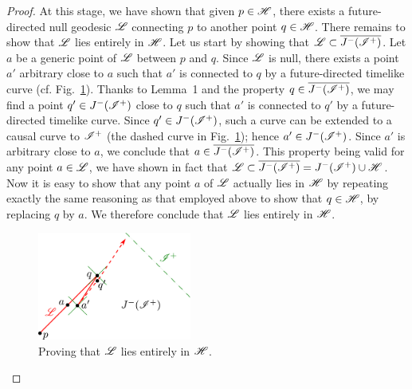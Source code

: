 \begin{proof}
At this stage, we have shown that given $p\in\mathscr{H}$, there exists
a future-directed null geodesic $\mathscr{L}$ connecting $p$ to another point $q\in\mathscr{H}$.
There remains to show that $\mathscr{L}$ lies entirely in $\mathscr{H}$.
Let us start by showing that $\mathscr{L}\subset \overline{J^-(\mathscr{I}^+)}$.
Let $a$ be a generic point of $\mathscr{L}$ between $p$ and $q$. Since $\mathscr{L}$ is
null, there exists a point
$a'$ arbitrary close to $a$ such that $a'$ is connected to $q$ by a
future-directed timelike curve (cf. Fig.~\ref{f:glo:L_in_H}). Thanks to Lemma~1
and the property $q\in \overline{J^-(\mathscr{I}^+)}$, we may
find a point $q'\in J^-(\mathscr{I}^+)$ close to $q$ such that $a'$ is connected
to $q'$ by a future-directed timelike curve.
Since $q'\in J^-(\mathscr{I}^+)$, such a curve can be extended
to a causal curve to $\mathscr{I}^+$  (the dashed curve
in Fig.~\ref{f:glo:L_in_H}); hence
$a'\in  J^-(\mathscr{I}^+)$. Since $a'$ is arbitrary close to $a$, we conclude
that $a\in\overline{J^-(\mathscr{I}^+)}$.
This property being valid for any point $a\in \mathscr{L}$, we have
shown in fact that $\mathscr{L}\subset \overline{J^-(\mathscr{I}^+)} = J^-(\mathscr{I}^+)\cup \mathscr{H}$.
Now it is easy to show that any point $a$ of $\mathscr{L}$ actually lies in $\mathscr{H}$
by repeating exactly the same reasoning as that employed above to show that
$q\in\mathscr{H}$, by replacing $q$ by $a$. We therefore conclude that
$\mathscr{L}$ lies entirely in $\mathscr{H}$.

\begin{figure}
\centerline{\includegraphics[width=0.45\textwidth]{glo_L_in_H.pdf}}
\caption[]{\label{f:glo:L_in_H} \footnotesize
Proving that $\mathscr{L}$ lies entirely in $\mathscr{H}$.}
\end{figure}




\end{proof}
